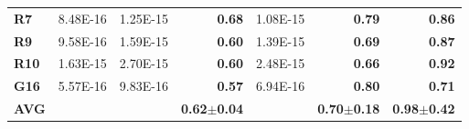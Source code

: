 \documentclass[encoding=utf8,british]{tumphthesis}
\begin{document}
\begin{table}[H]
\begin{subtable}{1.0\textwidth}
{\begin{tabular}{|l|llr|lr|r|}
\textbf{R7}                               & 8.48E-16                                             & 1.25E-15                                              & \textbf{0.68}                                    & 1.08E-15                                                       & \textbf{0.79}                                    & \textbf{0.86}                                            \\
\rowcolor[HTML]{CFE2F3} 
\textbf{R9}                               & 9.58E-16                                             & 1.59E-15                                              & \textbf{0.60}                                    & 1.39E-15                                                       & \textbf{0.69}                                    & \textbf{0.87}                                            \\
\textbf{R10}                              & 1.63E-15                                             & 2.70E-15                                              & \textbf{0.60}                                    & 2.48E-15                                                       & \textbf{0.66}                                    & \textbf{0.92}                                            \\
\rowcolor[HTML]{CFE2F3} 
\textbf{G16}                              & 5.57E-16                                             & 9.83E-16                                              & \textbf{0.57}                                    & 6.94E-16                                                       & \textbf{0.80}                                    & \textbf{0.71}                                            \\ \hline
\textbf{AVG}                             &                                                      &                                                       & \textbf{0.62$\pm$0.04}                           &                                                                & \textbf{0.70$\pm$0.18}                           & \textbf{0.98$\pm$0.42}                                  
\\ \hline
\end{tabular}}
    \end{subtable}
\end{table}
\end{document}
